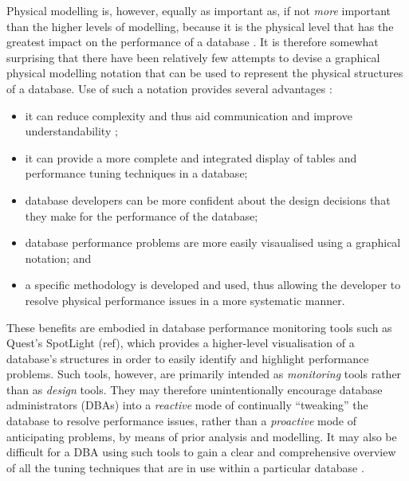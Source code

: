 \documentclass{llncs}
\begin{document}
Physical modelling is, however, equally as important as, if not
\emph{more} important than the higher levels of modelling, because it is
the physical level that has the greatest impact on the performance of a
database \cite{BeDa-P-2003}. It is therefore somewhat surprising that
there have been relatively few attempts to devise a graphical physical
modelling notation that can be used to represent the physical structures
of a database. Use of such a notation provides several advantages
\cite{BeDa-P-1992-PDD,Conn-TM-2002,Will-J-1992}:

\begin{itemize}

	\item it can reduce complexity and thus aid communication and
	improve understandability \cite{Tuft-ER-1997};

	\item it can provide a more complete and integrated display of
	tables and performance tuning techniques in a database;

	\item database developers can be more confident about the design
	decisions that they make for the performance of the database;

	\item database performance problems are more easily visaualised
	using a graphical notation; and

	\item a specific methodology is developed and used, thus allowing
	the developer to resolve physical performance issues in a more
	systematic manner.

\end{itemize}

These benefits are embodied in database performance monitoring tools
such as Quest's SpotLight (ref), which provides a higher-level
visualisation of a database's structures in order to easily identify and
highlight performance problems. Such tools, however, are primarily
intended as \emph{monitoring} tools rather than as \emph{design} tools.
They may therefore unintentionally encourage database administrators
(DBAs) into a \emph{reactive} mode of continually ``tweaking'' the
database to resolve performance issues, rather than a \emph{proactive}
mode of anticipating problems, by means of prior analysis and modelling.
It may also be difficult for a DBA using such tools to gain a clear and
comprehensive overview of all the tuning techniques that are in use
within a particular database \cite{Core-MJ-1997-OracleDW}.
\end{document}

